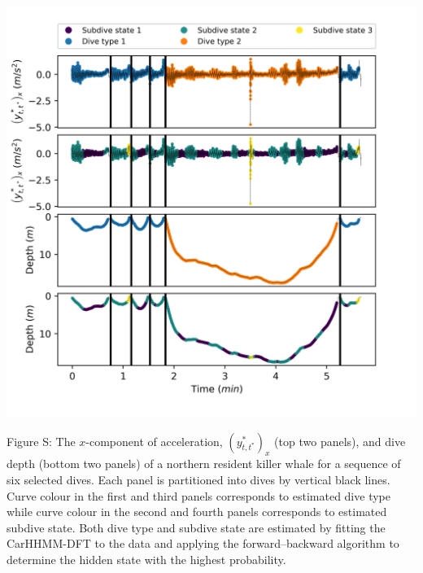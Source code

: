 \documentclass{article}
\begin{document}
        \begin{center}
        \includegraphics[width=6in]{../Plots/2019/20190902-182840-CATs_OB_1_0_267_CarHHMM2_decoded_dives.png}
        \end{center}
        
        \noindent Figure S: The $x$-component of acceleration, $(y^*_{t,t^*})_x$ (top two panels), and dive depth (bottom two panels) of a northern resident killer whale for a sequence of six selected dives. Each panel is partitioned into dives by vertical black lines. Curve colour in the first and third panels corresponds to estimated dive type while curve colour in the second and fourth panels corresponds to estimated subdive state. Both dive type and subdive state are estimated by fitting the CarHHMM-DFT to the data and applying the forward--backward algorithm to determine the hidden state with the highest probability.
        \addtocounter{fignum}{1}
        
\end{document}
